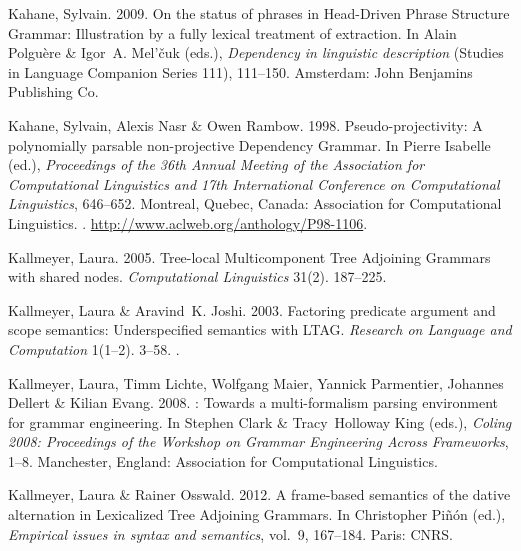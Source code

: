 \begin{thebibliography}{1420}
Kahane, Sylvain. 2009.
\newblock On the status of phrases in {Head-Driven Phrase Structure Grammar}:
  {Illustration} by a fully lexical treatment of extraction.
\newblock In Alain Polgu{\`e}re \& Igor~A. Mel'{\v c}uk (eds.),
  \emph{Dependency in linguistic description} (Studies in Language Companion
  Series 111), 111--150. Amsterdam: John Benjamins Publishing Co.

Kahane, Sylvain, Alexis Nasr \& Owen Rambow. 1998.
\newblock Pseudo-projectivity: {A} polynomially parsable non-projective
  {Dependency Grammar}.
\newblock In Pierre Isabelle (ed.), \emph{Proceedings of the 36th {Annual
  Meeting of the Association for Computational Linguistics and 17th
  International Conference on Computational Linguistics}}, 646--652. Montreal,
  Quebec, Canada: Association for Computational Linguistics.
\newblock {}.
\newblock \urlprefix\url{http://www.aclweb.org/anthology/P98-1106}.

Kallmeyer, Laura. 2005.
\newblock Tree-local {Multicomponent Tree Adjoining Grammars} with shared
  nodes.
\newblock \emph{Computational Linguistics} 31(2). 187--225.

Kallmeyer, Laura \& Aravind~K. Joshi. 2003.
\newblock Factoring predicate argument and scope semantics: Underspecified
  semantics with {LTAG}.
\newblock \emph{Research on Language and Computation} 1(1--2). 3--58.
\newblock {}.

Kallmeyer, Laura, Timm Lichte, Wolfgang Maier, Yannick Parmentier, Johannes
  Dellert \& Kilian Evang. 2008.
: {Towards} a multi-formalism parsing environment for grammar
  engineering.
\newblock In Stephen Clark \& Tracy~Holloway King (eds.), \emph{Coling 2008:
  {Proceedings} of the {Workshop on Grammar Engineering Across Frameworks}},
  1--8. Manchester, England: Association for Computational Linguistics.

Kallmeyer, Laura \& Rainer Osswald. 2012.
\newblock A frame-based semantics of the dative alternation in {Lexicalized
  Tree Adjoining Grammars}.
\newblock In Christopher Pi{\~n}{\'o}n (ed.), \emph{Empirical issues in syntax
  and semantics}, vol.~9, 167--184. Paris: CNRS.


\end{thebibliography}
